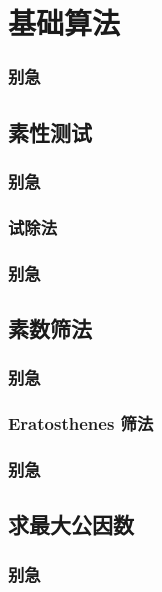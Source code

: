 
\section{基础算法}
\begin{frame} %
  \frametitle{别急}
\end{frame}
\subsection{素性测试}
\begin{frame}[c]
  \progressnow*
\end{frame}
\begin{frame} %
  \frametitle{别急}
\end{frame}
\subsubsection{试除法}
\begin{frame}[c]
  \progressnow
\end{frame}
\begin{frame} %
  \frametitle{别急}
\end{frame}
\subsection{素数筛法}
\begin{frame}[c]
  \progressnow*
\end{frame}
\begin{frame} %
  \frametitle{别急}
\end{frame}
\subsubsection{Eratosthenes 筛法}
\begin{frame}[c]
  \progressnow
\end{frame}
\begin{frame} %
  \frametitle{别急}
\end{frame}
\subsection{求最大公因数}
\begin{frame}[c]
  \progressnow*
\end{frame}
\begin{frame} %
  \frametitle{别急}
\end{frame}
